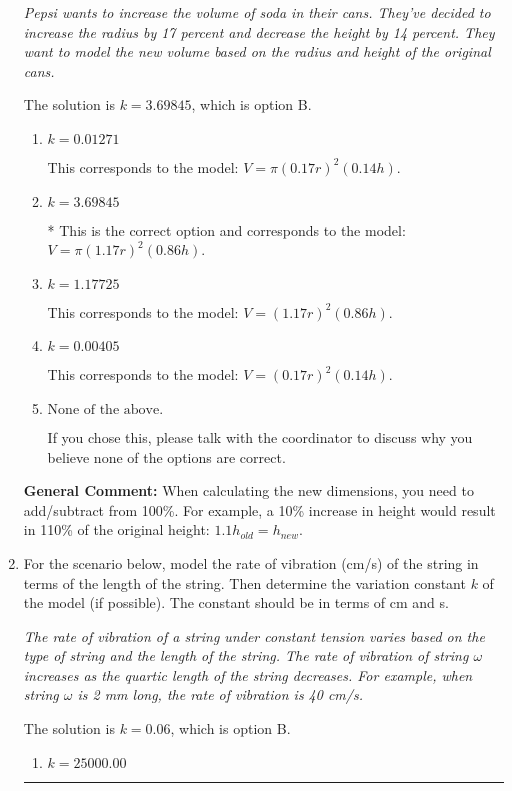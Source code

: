 \documentclass{extbook}[14pt]
\newcommand{\litem}[1]{\item #1

\rule{\textwidth}{0.4pt}}
\begin{document}
\begin{enumerate}
{\begin{center}
    \textit{ Pepsi wants to increase the volume of soda in their cans. They've decided to increase the radius by 17 percent and decrease the height by 14 percent. They want to model the new volume based on the radius and height of the original cans. }
\end{center}
The solution is \( k = 3.69845 \), which is option B.\begin{enumerate}[label=\Alph*.]
\item \( k = 0.01271 \)

This corresponds to the model: $V = \pi (0.17 r)^2 (0.14 h)$.
\item \( k = 3.69845 \)

* This is the correct option and corresponds to the model: $V = \pi (1.17 r)^2 (0.86 h)$.
\item \( k = 1.17725 \)

This corresponds to the model: $V = (1.17 r)^2 (0.86 h)$.
\item \( k = 0.00405 \)

This corresponds to the model: $V = (0.17 r)^2 (0.14 h)$.
\item \( \text{None of the above.} \)

If you chose this, please talk with the coordinator to discuss why you believe none of the options are correct.
\end{enumerate}

\textbf{General Comment:} When calculating the new dimensions, you need to add/subtract from 100\%. For example, a 10\% increase in height would result in 110\% of the original height: $1.1h_{old} = h_{new}$.
}
\litem{
For the scenario below, model the rate of vibration (cm/s) of the string in terms of the length of the string. Then determine the variation constant $k$ of the model (if possible). The constant should be in terms of cm and s.

\begin{center}
    \textit{ The rate of vibration of a string under constant tension varies based on the type of string and the length of the string. The rate of vibration of string $\omega$ increases as the quartic length of the string decreases. For example, when string $\omega$ is 2 mm long, the rate of vibration is 40 cm/s. }
\end{center}
The solution is \( k = 0.06 \), which is option B.\begin{enumerate}[label=\Alph*.]
\item \( k = 25000.00 \)


\end{enumerate}}
\end{enumerate}
\end{document}

